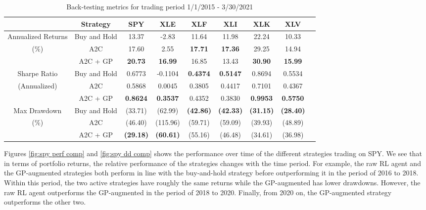\documentclass[12pt]{article}
\begin{document}
\begin{table}[t]
	\centering
	\begin{tabular}{c|c|c|c c c c c c}
	\hline
	& Strategy & SPY & XLE & XLF & XLI & XLK & XLV \\
	\hline
	Annualized Returns & Buy and Hold & 13.37 & -2.83 & 11.64 & 11.98 & 22.24 & 10.33 \\
	(\%) & A2C & 17.60 & 2.55 & \textbf{17.71} & \textbf{17.36} & 29.25 & 14.94 \\
	& A2C + GP & \textbf{20.73} & \textbf{16.99} & 16.85 & 13.43 & \textbf{30.90} & \textbf{15.99} \\
	\hline
	Sharpe Ratio & Buy and Hold & 0.6773 & -0.1104 & \textbf{0.4374} & \textbf{0.5147} & 0.8694 & 0.5534 \\
	(Annualized) & A2C & 0.5868 & 0.0045 & 0.3805 & 0.4417 & 0.7101 & 0.4367 \\
	& A2C + GP & \textbf{0.8624} & \textbf{0.3537} & 0.4352 & 0.3830 & \textbf{0.9953} & \textbf{0.5750} \\
	\hline
	Max Drawdown & Buy and Hold & (33.71) & (62.99) & \textbf{(42.86)} & \textbf{(42.33)} & \textbf{(31.15)} & \textbf{(28.40)} \\
	(\%) & A2C & (46.40) & (115.96) & (59.71) & (59.09) & (39.93) & (48.89) \\
	& A2C + GP & \textbf{(29.18)} & \textbf{(60.61)} & (55.16) & (46.48) & (34.61) & (36.98) \\
	\hline
	\end{tabular}
	\caption{Back-testing metrics for trading period 1/1/2015 - 3/30/2021}
	\label{tab:results summary}
\end{table}

Figures \ref{fig:spy perf comp} and \ref{fig:spy dd comp} shows the performance over time of the different strategies trading on SPY. We see that in terms of portfolio returns, the relative performance of the strategies changes with the time period. For example, the raw RL agent and the GP-augmented strategies both perform in line with the buy-and-hold strategy before outperforming it in the period of 2016 to 2018. Within this period, the two active strategies have roughly the same returns while the GP-augmented has lower drawdowns. However, the raw RL agent outperforms the GP-augmented in the period of 2018 to 2020. Finally, from 2020 on, the GP-augmented strategy outperforms the other two.
\end{document}
